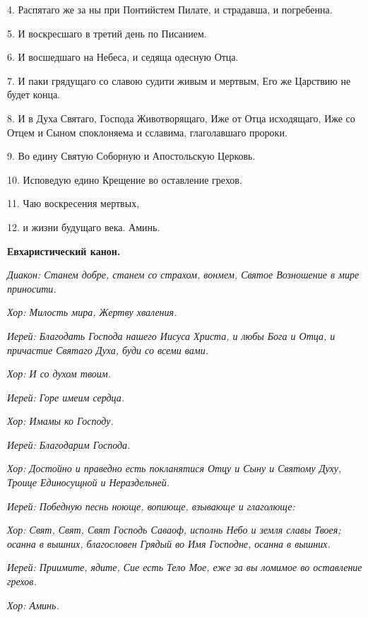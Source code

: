 4. Распятаго же за ны при Понтийстем Пилате, и страдавша, и погребенна.


5. И воскресшаго в третий день по Писанием.


6. И восшедшаго на Небеса, и седяща одесную Отца.


7. И паки грядущаго со славою судити живым и мертвым, Его же Царствию не будет конца.


8. И в Духа Святаго, Господа Животворящаго, Иже от Отца исходящаго, Иже со Отцем и Сыном споклоняема и сславима, глаголавшаго пророки.


9. Во едину Святую Соборную и Апостольскую Церковь.


10. Исповедую едино Крещение во оставление грехов.


11. Чаю воскресения мертвых,


12. и жизни будущаго века. Аминь.






\bfseries  Евхаристический канон.\normalfont{}


\itshape Диакон:\normalfont{} Станем добре, станем со страхом, вонмем, Святое Возношение в мире приносити.


\itshape Хор:\normalfont{} Милость мира, Жертву хваления.


\itshape Иерей:\normalfont{} Благодать Господа нашего Иисуса Христа, и любы Бога и Отца, и причастие Святаго Духа, буди со всеми вами.


\itshape Хор:\normalfont{} И со духом твоим.


\itshape Иерей:\normalfont{} Горе имеим сердца.


\itshape Хор:\normalfont{} Имамы ко Господу.


\itshape Иерей:\normalfont{} Благодарим Господа.


\itshape Хор:\normalfont{} Достойно и праведно есть покланятися Отцу и Сыну и Святому Духу, Троице Единосущной и Нераздельней.


\itshape Иерей:\normalfont{} Победную песнь ноюще, вопиюще, взывающе и глаголюще:


\itshape Хор:\normalfont{} Свят, Свят, Свят Господь Саваоф, исполнь Небо и земля славы Твоея; осанна в вышних, благословен Грядый во Имя Господне, осанна в вышних.


\itshape Иерей:\normalfont{} Приимите, ядите, Сие есть Тело Мое, еже за вы ломимое во оставление грехов.


\itshape Хор:\normalfont{} Аминь.


